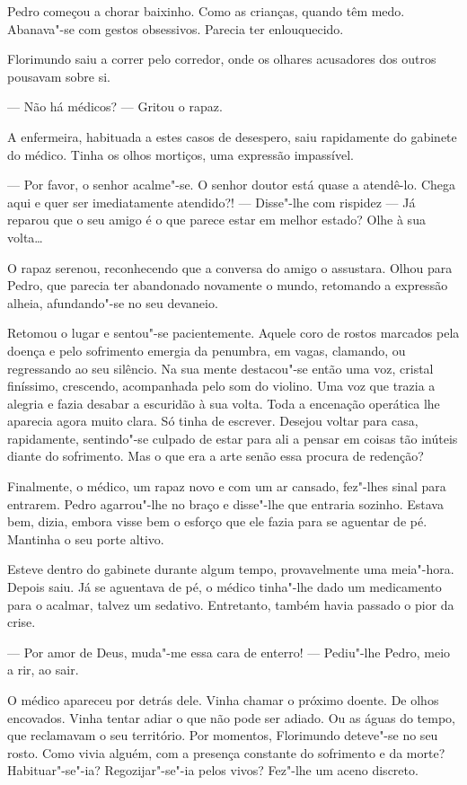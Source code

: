 Pedro começou a chorar baixinho. Como as crianças, quando têm medo.
Abanava"-se com gestos obsessivos. Parecia ter enlouquecido.

Florimundo saiu a correr pelo corredor, onde os olhares acusadores dos
outros pousavam sobre si.

--- Não há médicos? --- Gritou o rapaz.

A enfermeira, habituada a estes casos de desespero, saiu rapidamente do
gabinete do médico. Tinha os olhos mortiços, uma expressão impassível.

--- Por favor, o senhor acalme"-se. O senhor doutor está quase a atendê-lo.
Chega aqui e quer ser imediatamente atendido?! ---  Disse"-lhe com rispidez
--- Já reparou que o seu amigo é o que parece estar em melhor estado? Olhe
à sua volta\ldots{}

O rapaz serenou, reconhecendo que a conversa do amigo o assustara. Olhou
para Pedro, que parecia ter abandonado novamente o mundo, retomando a
expressão alheia, afundando"-se no seu devaneio.

Retomou o lugar e sentou"-se pacientemente. Aquele coro de rostos
marcados pela doença e pelo sofrimento emergia da penumbra, em vagas,
clamando, ou regressando ao seu silêncio. Na sua mente destacou"-se então
uma voz, cristal finíssimo, crescendo, acompanhada pelo som do violino.
Uma voz que trazia a alegria e fazia desabar a escuridão à sua volta.
Toda a encenação operática lhe aparecia agora muito clara. Só tinha de
escrever. Desejou voltar para casa, rapidamente, sentindo"-se culpado de
estar para ali a pensar em coisas tão inúteis diante do sofrimento. Mas
o que era a arte senão essa procura de redenção?

Finalmente, o médico, um rapaz novo e com um ar cansado, fez"-lhes sinal
para entrarem. Pedro agarrou"-lhe no braço e disse"-lhe que entraria
sozinho. Estava bem, dizia, embora visse bem o esforço que ele fazia
para se aguentar de pé. Mantinha o seu porte altivo.

Esteve dentro do gabinete durante algum tempo, provavelmente uma
meia"-hora. Depois saiu. Já se aguentava de pé, o médico tinha"-lhe dado
um medicamento para o acalmar, talvez um sedativo. Entretanto, também
havia passado o pior da crise.

--- Por amor de Deus, muda"-me essa cara de enterro! --- Pediu"-lhe Pedro,
meio a rir, ao sair.

O médico apareceu por detrás dele. Vinha chamar o próximo doente. De
olhos encovados. Vinha tentar adiar o que não pode ser adiado. Ou as
águas do tempo, que reclamavam o seu território. Por momentos,
Florimundo deteve"-se no seu rosto. Como vivia alguém, com a presença
constante do sofrimento e da morte? Habituar"-se"-ia? Regozijar"-se"-ia
pelos vivos? Fez"-lhe um aceno discreto.

